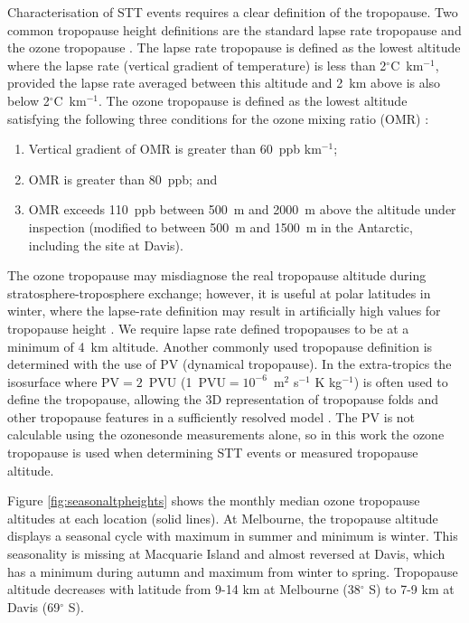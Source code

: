 \documentclass[acp, manuscript]{copernicus} %
\begin{document}
    Characterisation of STT events requires a clear definition of the tropopause.
    Two common tropopause height definitions are the standard lapse rate tropopause \citep{WMO1957} and the ozone tropopause \citep{Bethan1996}.
    The lapse rate tropopause is defined as the lowest altitude where the lapse rate (vertical gradient of temperature) is less than 2$^\circ$C~km$^{-1}$, provided the lapse rate averaged between this altitude and 2~km above is also below 2$^\circ$C~km$^{-1}$.
    The ozone tropopause is defined as the lowest altitude satisfying the following three conditions for the ozone mixing ratio (OMR) \citep{Bethan1996}:
    \begin{enumerate}
      \item Vertical gradient of OMR is greater than 60~ppb km$^{-1}$;
      \item OMR is greater than 80~ppb; and
      \item OMR exceeds 110~ppb between 500~m and 2000~m above the altitude under inspection (modified to between 500~m and 1500~m in the Antarctic, including the site at Davis).
    \end{enumerate}
    The ozone tropopause may misdiagnose the real tropopause altitude during stratosphere-troposphere exchange; however, it is useful at polar latitudes in winter, where the lapse-rate definition may result in artificially high values for tropopause height \citep{Bethan1996, Tomikawa2009, Alexander2013}.
    We require lapse rate defined tropopauses to be at a minimum of 4~km altitude. %
    Another commonly used tropopause definition is determined with the use of PV (dynamical tropopause).
    In the extra-tropics the isosurface where PV$=2$~PVU (1~PVU$= 10^{-6}$~m$^2$ s$^{-1}$ K kg$^{-1}$) is often used to define the tropopause, allowing the 3D representation of tropopause folds and other tropopause features in a sufficiently resolved model \citep{Skerlak2014,Tyrlis2014}.
    The PV is not calculable using the ozonesonde measurements alone, so in this work the ozone tropopause is used when determining STT events or measured tropopause altitude.
    
    Figure \ref{fig:seasonaltpheights} shows the monthly median ozone tropopause altitudes at each location (solid lines).
    At Melbourne, the tropopause altitude displays a seasonal cycle with maximum in summer and minimum is winter.
    This seasonality is missing at Macquarie Island and almost reversed at Davis, which has a minimum during autumn and maximum from winter to spring.
    Tropopause altitude decreases with latitude from 9-14 km at Melbourne (38$^\circ$ S) to 7-9 km at Davis (69$^\circ$ S).
\end{document}
